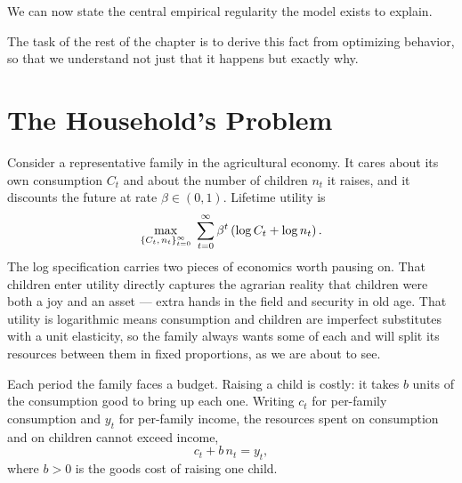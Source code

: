 We can now state the central empirical regularity the model exists to explain.


The task of the rest of the chapter is to derive this fact from optimizing behavior, so that we understand not just that it happens but exactly why.

\section{The Household's Problem}

Consider a representative family in the agricultural economy. It cares about its own consumption $C_t$ and about the number of children $n_t$ it raises, and it discounts the future at rate $\beta \in (0,1)$. Lifetime utility is
\begin{equation}
\max_{\{C_t,\, n_t\}_{t=0}^{\infty}} \;\sum_{t=0}^{\infty} \beta^{t}\left(\log C_t + \log n_t\right).
\label{eq:malthus-obj}
\end{equation}
The log specification carries two pieces of economics worth pausing on. That children enter utility directly captures the agrarian reality that children were both a joy and an asset --- extra hands in the field and security in old age. That utility is logarithmic means consumption and children are imperfect substitutes with a unit elasticity, so the family always wants some of each and will split its resources between them in fixed proportions, as we are about to see.

Each period the family faces a budget. Raising a child is costly: it takes $b$ units of the consumption good to bring up each one. Writing $c_t$ for per-family consumption and $y_t$ for per-family income, the resources spent on consumption and on children cannot exceed income,
\begin{equation}
c_t + b\, n_t = y_t,
\label{eq:malthus-budget}
\end{equation}
where $b > 0$ is the goods cost of raising one child.

